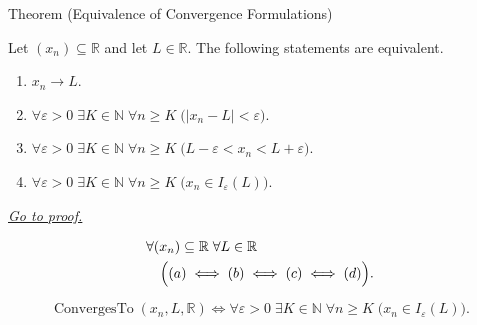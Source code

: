 \begin{theorembox}{Theorem (Equivalence of Convergence Formulations)}
\begin{theorem}
\label{thm:equivalence-of-convergence-formulations}

Let $(x_n) \subseteq \mathbb{R}$ and let $L \in \mathbb{R}$. The following
statements are equivalent.
\begin{enumerate}[label=\textup{(\alph*)}]
    \item $x_n \to L$.
    \item $\forall \varepsilon > 0 \;\exists K \in \mathbb{N} \;\forall n \ge K
          \;\bigl(|x_n - L| < \varepsilon\bigr)$.
    \item $\forall \varepsilon > 0 \;\exists K \in \mathbb{N} \;\forall n \ge K
          \;\bigl(L - \varepsilon < x_n < L + \varepsilon\bigr)$.
    \item $\forall \varepsilon > 0 \;\exists K \in \mathbb{N} \;\forall n \ge K
          \;\bigl(x_n \in I_\varepsilon(L)\bigr)$.
\end{enumerate}

\smallskip
\noindent
\hyperref[prf:equivalence-of-convergence-formulations]{\textit{Go to proof.}}
\end{theorem}
\end{theorembox}

\begin{remark*}
\[
\begin{aligned}
&\forall (x_n) \subseteq \mathbb{R} \;\forall L \in \mathbb{R}\\
&\quad\Bigl(
    (a) \;\Longleftrightarrow\; (b)
         \;\Longleftrightarrow\; (c)
         \;\Longleftrightarrow\; (d)
\Bigr).
\end{aligned}
\]
\end{remark*}

\begin{remark*}
\[
\operatorname{ConvergesTo}(x_n,L,\mathbb{R})
\Longleftrightarrow
\forall \varepsilon > 0 \;\exists K \in \mathbb{N} \;\forall n \ge K
\;\bigl(x_n \in I_\varepsilon(L)\bigr).
\]
\end{remark*}

